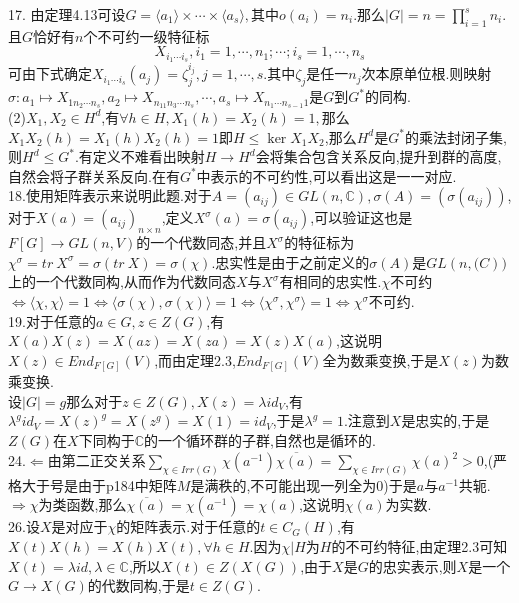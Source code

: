 \documentclass[b5paper]{ctexart}
\begin{document}
\pagestyle{plain}
\noindent
{}
17. 由定理4.13可设$G=\langle a_1\rangle \times \cdots \times\langle a_s\rangle,$其中$o(a_i)=n_i$.那么$|G|=n=\prod\limits_{i=1}^sn_i$.且$G$恰好有$n$个不可约一级特征标
\[X_{i_1\cdots i_s},i_1=1,\cdots,n_1;\cdots;i_s=1,\cdots,n_s\]
可由下式确定$X_{i_1\cdots i_s}(a_j)=\zeta_j^{i_j},j=1,\cdots,s$.其中$\zeta_j$是任一$n_j$次本原单位根.则映射$\sigma:a_1\mapsto X_{1n_2\cdots n_s},a_2\mapsto X_{n_11n_3\cdots n_s},\cdots,a_s\mapsto X_{n_1\cdots n_{s-1}1}$是$G$到$G^*$的同构.\\
(2)$X_1,X_2\in H^d$,有$\forall h\in H,X_1(h)=X_2(h)=1,$那么$X_1X_2(h)=X_1(h)X_2(h)=1$即$H\leq \ker X_1X_2$,那么$H^d$是$G^*$的乘法封闭子集,则$H^d\leq G^*$.有定义不难看出映射$H\to H^d$会将集合包含关系反向,提升到群的高度,自然会将子群关系反向.在有$G^*$中表示的不可约性,可以看出这是一一对应.\\
18.使用矩阵表示来说明此题.对于$A=(a_{ij})\in GL(n,\mathbb{C
}),\sigma(A)=(\sigma(a_{ij}))$,对于$X(a)=(a_{ij})_{n\times n}$,定义$X^{\sigma}(a)=\sigma(a_{ij})$,可以验证这也是$F[G]\to GL(n,V)$的一个代数同态,并且$X^{\sigma}$的特征标为$\chi^{\sigma}=tr~X^{\sigma}=\sigma(tr~X)=\sigma(\chi)$.忠实性是由于之前定义的$\sigma(A)$是$GL(n,\mathbb(C))$上的一个代数同构,从而作为代数同态$X$与$X^{\sigma}$有相同的忠实性.$\chi$不可约$\Leftrightarrow \langle \chi ,\chi\rangle=1\Leftrightarrow \langle \sigma(\chi) ,\sigma(\chi)\rangle=1\Leftrightarrow \langle \chi^\sigma ,\chi^\sigma\rangle=1$$\Leftrightarrow\chi^{\sigma}$不可约.\\
19.对于任意的$a\in G,z\in Z(G)$,有$X(a)X(z)=X(az)=X(za)=X(z)X(a)$,这说明$X(z)\in End_{F[G]}(V)$,而由定理2.3,$End_{F[G]}(V)$全为数乘变换,于是$X(z)$为数乘变换.\\
设$|G|=g$那么对于$z\in Z(G),X(z)=\lambda id_V$,有$\lambda^g id_V=X(z)^g=X(z^g)=X(1)=id_V$,于是$\lambda^g=1$.注意到$X$是忠实的,于是$Z(G)$在$X$下同构于$\mathbb{C}$的一个循环群的子群,自然也是循环的.\\
24.$\Leftarrow$由第二正交关系$\sum\limits_{\chi\in Irr(G)}\chi(a^{-1})\overline{\chi(a)}=\sum\limits_{\chi\in Irr(G)}\chi(a)^2>0$,(严格大于号是由于p184中矩阵$M$是满秩的,不可能出现一列全为0)于是$a$与$a^{-1}$共轭.\\
$\Rightarrow$$\chi$为类函数,那么$\overline{\chi(a)}=\chi(a^{-1})=\chi(a)$,这说明$\chi(a)$为实数.\\
26.设$X$是对应于$\chi$的矩阵表示.对于任意的$t\in C_G(H)$,有$X(t)X(h)=X(h)X(t),\forall h\in H$.因为$\chi|H$为$H$的不可约特征,由定理2.3可知$X(t)=\lambda id,\lambda\in\mathbb{C}$,所以$X(t)\in Z(X(G))$,由于$X$是$G$的忠实表示,则$X$是一个$G\to X(G)$的代数同构,于是$t\in Z(G)$.\\
\end{document}
